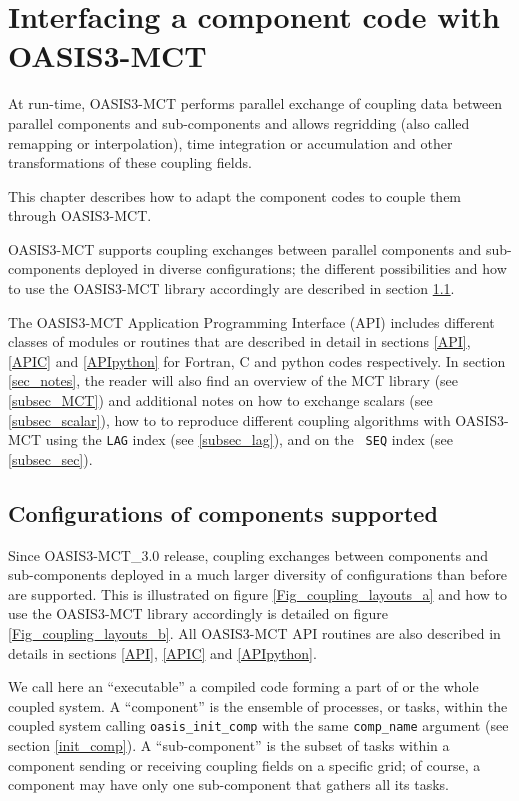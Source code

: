 \newpage
\chapter{Interfacing a component code with OASIS3-MCT}
\label{sec_modelinterfacing}

At run-time, OASIS3-MCT performs parallel exchange of coupling data between parallel
components and sub-components and allows regridding (also called remapping or interpolation), time integration or accumulation and other transformations of these coupling fields. 

This chapter describes how to adapt the component codes to couple them through OASIS3-MCT. 

OASIS3-MCT supports coupling exchanges between parallel
components and sub-components deployed in diverse
configurations; the different possibilities and how to use
the OASIS3-MCT library accordingly are described in section
\ref{sec_deploy}. 

The OASIS3-MCT Application Programming Interface (API) includes different classes of modules or routines that are described in detail in sections \ref{API}, \ref{APIC} and \ref{APIpython} for Fortran, C and python codes respectively.
In section \ref{sec_notes}, the reader will also find an overview of the MCT library (see \ref{subsec_MCT}) and additional notes on how to exchange scalars (see \ref{subsec_scalar}), how to to reproduce different coupling
algorithms with OASIS3-MCT using the {\tt LAG} index (see \ref{subsec_lag}), and on the {\tt
  SEQ} index (see \ref{subsec_sec}).

\section{Configurations of components supported}
\label{sec_deploy}

Since OASIS3-MCT\_3.0 release, coupling exchanges between components and
sub-components deployed in a much larger diversity of configurations
than before 
are supported. This is illustrated on figure
\ref{Fig_coupling_layouts_a} and how to use the OASIS3-MCT library
accordingly is detailed on figure \ref{Fig_coupling_layouts_b}. All
OASIS3-MCT API routines are also described in details in sections
\ref{API}, \ref{APIC} and \ref{APIpython}. 

We call here an ``executable'' a compiled code
  forming a part of or the whole coupled system. A ``component'' is the ensemble of
  processes, or tasks, within the coupled system calling {\tt oasis\_init\_comp}
  with the same {\tt comp\_name} argument (see section
  \ref{init_comp}). A ``sub-component'' is the subset of tasks within a
  component sending or receiving coupling fields on a specific grid;
  of course, a component may have only one sub-component
  that gathers all its tasks.

